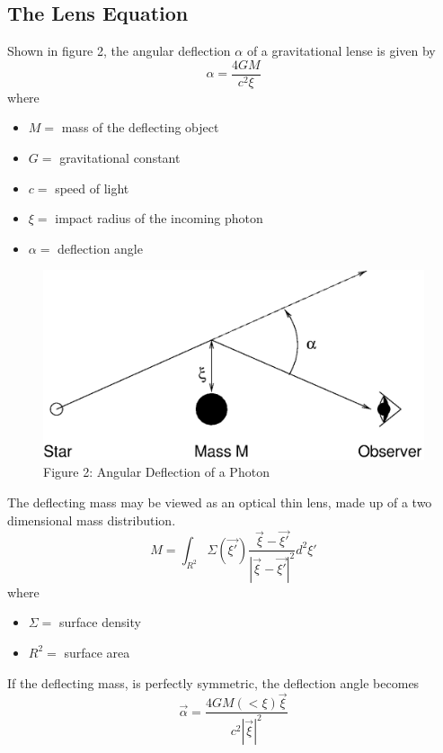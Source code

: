 \documentclass[a4paper]{IEEEtran}
\begin{document}
\subsection{The Lens Equation}
Shown in figure 2, the angular deflection $\alpha$ of a 
gravitational lense is given by
\begin{equation}    
    \alpha = \frac{4GM}{c^2 \xi}
\end{equation}
where
\begin{itemize}
    \item $M = $ mass of the deflecting object
    \item $G = $ gravitational constant
    \item $c = $ speed of light
    \item $\xi = $ impact radius of the incoming photon
    \item $\alpha = $ deflection angle
\end{itemize}

\begin{figure}
    \begin{center}
        \caption{Figure 2: Angular Deflection of a Photon} 
        \label{fig:photon} 
        \includegraphics[width=\columnwidth]{images/gldiag.eps}
    \end{center}
\end{figure}

The deflecting mass may be viewed as an optical thin lens, made up
of a two dimensional mass distribution.
\begin{equation}
    M = \int_{R^2} \Sigma(\vec{\xi '}) 
        \frac{\vec{\xi} - \vec{\xi '} }{|\vec{\xi} - \vec{\xi '}|^2} d^2 \xi '
\end{equation}
where
\begin{itemize}
    \item $\Sigma = $ surface density
    \item $R^2 = $ surface area
\end{itemize}
If the deflecting mass, is perfectly symmetric, the deflection angle becomes
\begin{equation}
    \vec{\alpha} = \frac{4GM(<\xi)\vec{\xi}}{c^2|\vec{\xi}|^2}
\end{equation}
\end{document}
